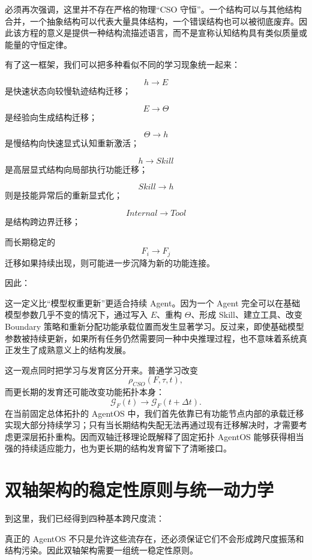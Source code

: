 必须再次强调，这里并不存在严格的物理“CSO 守恒”。一个结构可以与其他结构合并，一个抽象结构可以代表大量具体结构，一个错误结构也可以被彻底废弃。因此该方程的意义是提供一种结构流描述语言，而不是宣称认知结构具有类似质量或能量的守恒定律。

有了这一框架，我们可以把多种看似不同的学习现象统一起来：

\[
h\rightarrow E
\]
是快速状态向较慢轨迹结构迁移；

\[
E\rightarrow\Theta
\]
是经验向生成结构迁移；

\[
\Theta\rightarrow h
\]
是慢结构向快速显式认知重新激活；

\[
h\rightarrow Skill
\]
是高层显式结构向局部执行功能迁移；

\[
Skill\rightarrow h
\]
则是技能异常后的重新显式化；

\[
Internal\rightarrow Tool
\]
是结构跨边界迁移；

而长期稳定的
\[
F_i\rightarrow F_j
\]
迁移如果持续出现，则可能进一步沉降为新的功能连接。

因此：
\begin{statementbox}
\centering
{}
\end{statementbox}

这一定义比“模型权重更新”更适合持续 Agent。因为一个 Agent 完全可以在基础模型参数几乎不变的情况下，通过写入 $E$、重构 $\Theta$、形成 Skill、建立工具、改变 Boundary 策略和重新分配功能承载位置而发生显著学习。反过来，即使基础模型参数被持续更新，如果所有任务仍然需要同一种中央推理过程，也不意味着系统真正发生了成熟意义上的结构发展。

这一观点同时把学习与发育区分开来。普通学习改变
\[
\rho_{CSO}(F,\tau,t),
\]
而更长期的发育还可能改变功能拓扑本身：
\[
\mathcal G_F(t)
\rightarrow
\mathcal G_F(t+\Delta t).
\]
在当前固定总体拓扑的 AgentOS 中，我们首先依靠已有功能节点内部的承载迁移实现大部分持续学习；只有当长期结构失配无法再通过现有迁移解决时，才需要考虑更深层拓扑重构。因而双轴迁移理论既解释了固定拓扑 AgentOS 能够获得相当强的持续适应能力，也为更长期的结构发育留下了清晰接口。


\section{双轴架构的稳定性原则与统一动力学}

到这里，我们已经得到四种基本跨尺度流：
\begin{statementbox}
\centering
{}
\end{statementbox}
真正的 AgentOS 不只是允许这些流存在，还必须保证它们不会形成跨尺度振荡和结构污染。因此双轴架构需要一组统一稳定性原则。

